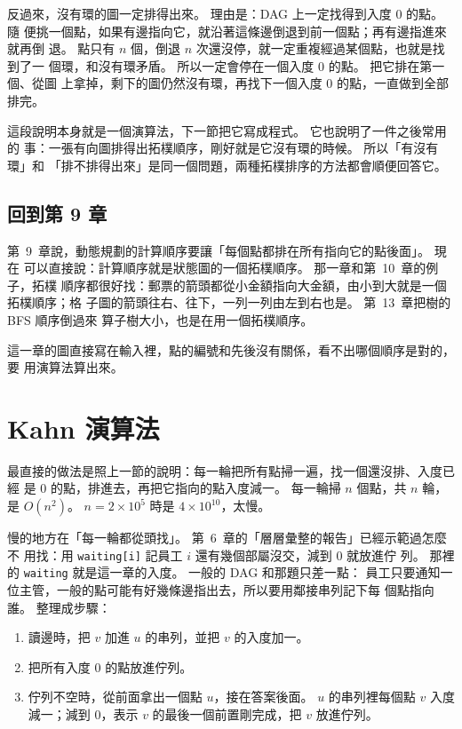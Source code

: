 反過來，沒有環的圖一定排得出來。 理由是：DAG 上一定找得到入度 $0$ 的點。 隨
便挑一個點，如果有邊指向它，就沿著這條邊倒退到前一個點；再有邊指進來就再倒
退。 點只有 $n$ 個，倒退 $n$ 次還沒停，就一定重複經過某個點，也就是找到了一
個環，和沒有環矛盾。 所以一定會停在一個入度 $0$ 的點。 把它排在第一個、從圖
上拿掉，剩下的圖仍然沒有環，再找下一個入度 $0$ 的點，一直做到全部排完。

這段說明本身就是一個演算法，下一節把它寫成程式。 它也說明了一件之後常用的
事：一張有向圖排得出拓樸順序，剛好就是它沒有環的時候。 所以「有沒有環」和
「排不排得出來」是同一個問題，兩種拓樸排序的方法都會順便回答它。

\subsection{回到第 9 章}

第~9~章說，動態規劃的計算順序要讓「每個點都排在所有指向它的點後面」。 現在
可以直接說：計算順序就是狀態圖的一個拓樸順序。 那一章和第~10~章的例子，拓樸
順序都很好找：郵票的箭頭都從小金額指向大金額，由小到大就是一個拓樸順序；格
子圖的箭頭往右、往下，一列一列由左到右也是。 第~13~章把樹的 BFS 順序倒過來
算子樹大小，也是在用一個拓樸順序。

這一章的圖直接寫在輸入裡，點的編號和先後沒有關係，看不出哪個順序是對的，要
用演算法算出來。

\section{Kahn 演算法}
\label{sec:kahn}

最直接的做法是照上一節的說明：每一輪把所有點掃一遍，找一個還沒排、入度已經
是 $0$ 的點，排進去，再把它指向的點入度減一。 每一輪掃 $n$ 個點，共 $n$ 輪，
是 $O(n^2)$。 $n = 2 \times 10^5$ 時是 $4 \times 10^{10}$，太慢。

慢的地方在「每一輪都從頭找」。 第~6~章的「層層彙整的報告」已經示範過怎麼不
用找：用 \texttt{waiting[i]} 記員工 $i$ 還有幾個部屬沒交，減到 $0$ 就放進佇
列。 那裡的 \texttt{waiting} 就是這一章的入度。 一般的 DAG 和那題只差一點：
員工只要通知一位主管，一般的點可能有好幾條邊指出去，所以要用鄰接串列記下每
個點指向誰。 整理成步驟：

\begin{enumerate}
\item 讀邊時，把 $v$ 加進 $u$ 的串列，並把 $v$ 的入度加一。
\item 把所有入度 $0$ 的點放進佇列。
\item 佇列不空時，從前面拿出一個點 $u$，接在答案後面。 $u$ 的串列裡每個點
$v$ 入度減一；減到 $0$，表示 $v$ 的最後一個前置剛完成，把 $v$ 放進佇列。
\end{enumerate}

